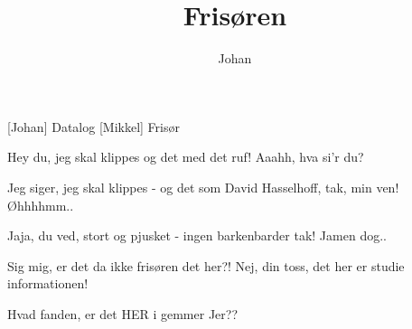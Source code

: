 \documentclass[a4paper,11pt]{article}
\title{Frisøren}
\author{Johan}
\begin{document}
\maketitle

\begin{roles}
  [Johan] Datalog
  [Mikkel] Frisør
\end{roles}

\begin{props}
\end{props}

  
\begin{sketch}


 Hey du, jeg skal klippes og det med det ruf!
 Aaahh, hva si'r du?

 Jeg siger, jeg skal klippes - og det som David Hasselhoff,
        tak, min ven!
 Øhhhhmm..

 Jaja, du ved, stort og pjusket - ingen barkenbarder tak!
 Jamen dog..

 Sig mig, er det da ikke frisøren det her?!
 Nej, din toss, det her er studie informationen!

 Hvad fanden, er det HER i gemmer Jer??


\end{sketch}
\end{document}
